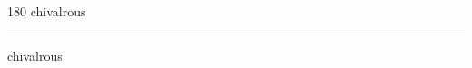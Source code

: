 
\begin{frame}
\begin{center}
\begin{turn}{180}
{\fontsize{2.5cm}{1em}\selectfont chivalrous}
\end{turn}
\vspace{1em}\par  
\hrule
\vspace{1em}\par  
{\fontsize{2.5cm}{1em}\selectfont chivalrous}
\end{center}
\end{frame}

